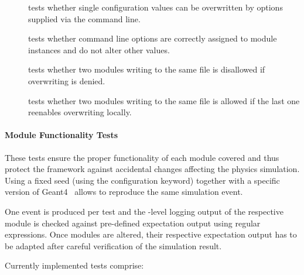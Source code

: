 \begin{description}
    \item[] tests whether single configuration values can be overwritten by options supplied via the command line.
    \item[] tests whether command line options are correctly assigned to module instances and do not alter other values.
    \item[] tests whether two modules writing to the same file is disallowed if overwriting is denied.
    \item[] tests whether two modules writing to the same file is allowed if the last one reenables overwriting locally.
\end{description}


\paragraph{Module Functionality Tests}

These tests ensure the proper functionality of each module covered and thus protect the framework against accidental changes affecting the physics simulation.
Using a fixed seed (using the  configuration keyword) together with a specific version of Geant4~\cite{geant4} allows to reproduce the same simulation event.

One event is produced per test and the -level logging output of the respective module is checked against pre-defined expectation output using regular expressions.
Once modules are altered, their respective expectation output has to be adapted after careful verification of the simulation result.

Currently implemented tests comprise:

